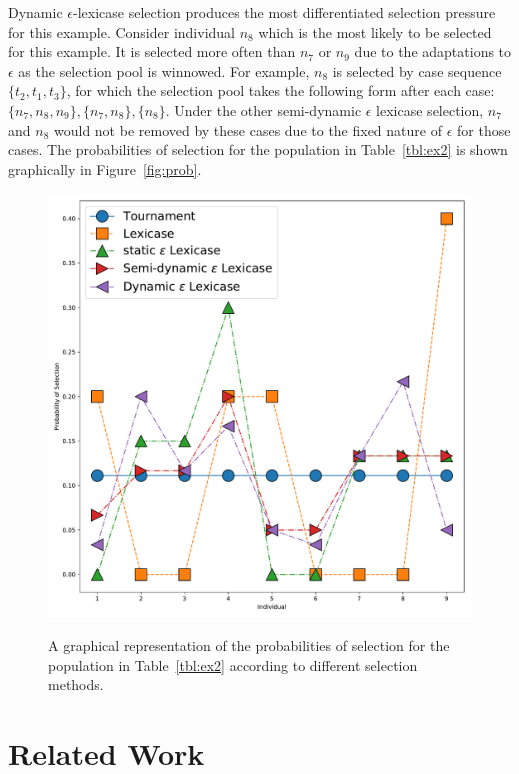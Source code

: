 \documentclass[preprint]{article}
\begin{document}
Dynamic $\epsilon$-lexicase selection produces the most differentiated selection pressure for this example. Consider individual $n_8$ which is the most likely to be selected for this example. It is selected more often than $n_7$ or $n_9$ due to the adaptations to $\epsilon$ as the selection pool is winnowed. For example, $n_8$ is selected by case sequence $\{t_2,t_1,t_3\}$, for which the selection pool takes the following form after each case: $\{n_7, n_8, n_9\}, \{n_7, n_8\}, \{n_8\}$. Under the other semi-dynamic $\epsilon$ lexicase selection, $n_7$ and $n_8$ would not be removed by these cases due to the fixed nature of $\epsilon$ for those cases. The probabilities of selection for the population in Table~\ref{tbl:ex2} is shown graphically in Figure~\ref{fig:prob}. 

\begin{figure}
\centering
  \includegraphics[height = 0.4\textheight]{figs/probabilities.pdf}\label{fig:prob}
  \caption{A graphical representation of the probabilities of selection for the population in Table~\ref{tbl:ex2} according to different selection methods.}\label{fig:boxplot_eps_e}
\end{figure}

 
\section{Related Work}\label{s:3}
\end{document}
